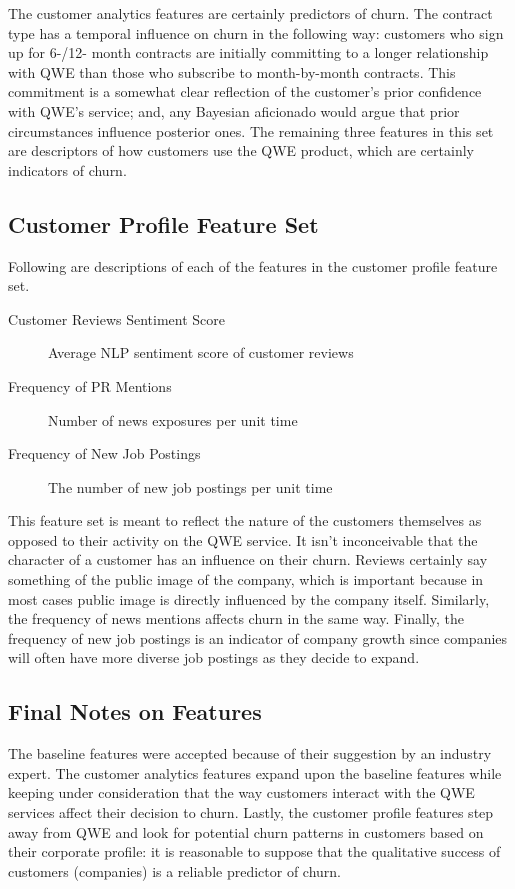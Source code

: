 \documentclass{article}
\begin{document}
	The customer analytics features are certainly predictors of churn. The contract type has a temporal influence on churn in the following way: customers who sign up for 6-/12- month contracts are initially committing to a longer relationship with QWE than those who subscribe to month-by-month contracts. This commitment is a somewhat clear reflection of the customer's prior confidence with QWE's service; and, any Bayesian aficionado would argue that prior circumstances influence posterior ones. The remaining three features in this set are descriptors of how customers use the QWE product, which are certainly indicators of churn.

	\subsection{Customer Profile Feature Set}
	
	Following are descriptions of each of the features in the customer profile feature set.
	
	\begin{description}
		\item[Customer Reviews Sentiment Score] Average NLP sentiment score of customer reviews
		\item[Frequency of PR Mentions] Number of news exposures per unit time
		\item[Frequency of New Job Postings] The number of new job postings per unit time
	\end{description}

	This feature set is meant to reflect the nature of the customers themselves as opposed to their activity on the QWE service. It isn't inconceivable that the character of a customer has an influence on their churn. Reviews certainly say something of the public image of the company, which is important because in most cases public image is directly influenced by the company itself. Similarly, the frequency of news mentions affects churn in the same way. Finally, the frequency of new job postings is an indicator of company growth since companies will often have more diverse job postings as they decide to expand.

	\subsection{Final Notes on Features}
	
	The baseline features were accepted because of their suggestion by an industry expert. The customer analytics features expand upon the baseline features while keeping under consideration that the way customers interact with the QWE services affect their decision to churn. Lastly, the customer profile features step away from QWE and look for potential churn patterns in customers based on their corporate profile: it is reasonable to suppose that the qualitative success of customers (companies) is a reliable predictor of churn.
	
\end{document}
